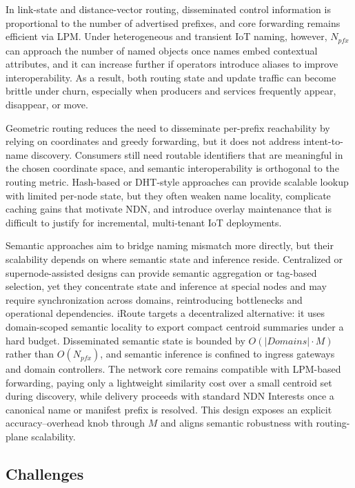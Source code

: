 \documentclass[journal]{IEEEtran}
\begin{document}
In link-state and distance-vector routing, disseminated control information is proportional to the number of advertised prefixes, and core forwarding remains efficient via LPM. Under heterogeneous and transient IoT naming, however, $N_{pfx}$ can approach the number of named objects once names embed contextual attributes, and it can increase further if operators introduce aliases to improve interoperability. As a result, both routing state and update traffic can become brittle under churn, especially when producers and services frequently appear, disappear, or move.

Geometric routing reduces the need to disseminate per-prefix reachability by relying on coordinates and greedy forwarding, but it does not address intent-to-name discovery. Consumers still need routable identifiers that are meaningful in the chosen coordinate space, and semantic interoperability is orthogonal to the routing metric. Hash-based or DHT-style approaches can provide scalable lookup with limited per-node state, but they often weaken name locality, complicate caching gains that motivate NDN, and introduce overlay maintenance that is difficult to justify for incremental, multi-tenant IoT deployments.

Semantic approaches aim to bridge naming mismatch more directly, but their scalability depends on where semantic state and inference reside. Centralized or supernode-assisted designs can provide semantic aggregation or tag-based selection, yet they concentrate state and inference at special nodes and may require synchronization across domains, reintroducing bottlenecks and operational dependencies. iRoute targets a decentralized alternative: it uses domain-scoped semantic locality to export compact centroid summaries under a hard budget. Disseminated semantic state is bounded by $O(|Domains|\cdot M)$ rather than $O(N_{pfx})$, and semantic inference is confined to ingress gateways and domain controllers. The network core remains compatible with LPM-based forwarding, paying only a lightweight similarity cost over a small centroid set during discovery, while delivery proceeds with standard NDN Interests once a canonical name or manifest prefix is resolved. This design exposes an explicit accuracy--overhead knob through $M$ and aligns semantic robustness with routing-plane scalability.

\subsection{Challenges}
\label{sec:bg_challenges}
\end{document}
